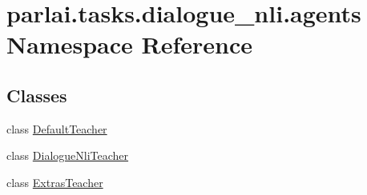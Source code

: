 \hypertarget{namespaceparlai_1_1tasks_1_1dialogue__nli_1_1agents}{}\section{parlai.\+tasks.\+dialogue\+\_\+nli.\+agents Namespace Reference}
\label{namespaceparlai_1_1tasks_1_1dialogue__nli_1_1agents}
\subsection*{Classes}
\begin{DoxyCompactItemize}
\item 
class \hyperlink{classparlai_1_1tasks_1_1dialogue__nli_1_1agents_1_1DefaultTeacher}{Default\+Teacher}
\item 
class \hyperlink{classparlai_1_1tasks_1_1dialogue__nli_1_1agents_1_1DialogueNliTeacher}{Dialogue\+Nli\+Teacher}
\item 
class \hyperlink{classparlai_1_1tasks_1_1dialogue__nli_1_1agents_1_1ExtrasTeacher}{Extras\+Teacher}
\end{DoxyCompactItemize}
